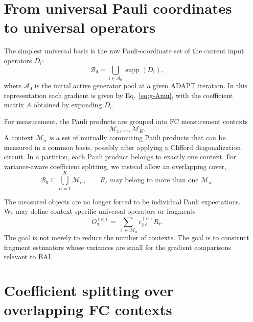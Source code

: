\documentclass[11pt]{article}
\newcommand{\supp}{\operatorname{supp}}
\begin{document}
\section{From universal Pauli coordinates to universal operators}

The simplest universal basis is the raw Pauli-coordinate set of the current input operators $D_i$:
\begin{equation}
    \mathcal B_0 = \bigcup_{i\in\mathcal A_0} \supp(D_i),
    \label{eq:parent-basis}
\end{equation}
where $\mathcal A_0$ is the initial active generator pool at a given ADAPT iteration. In this representation each gradient is given by Eq.~\eqref{eq:g-Amu}, with the coefficient matrix $A$ obtained by expanding $D_i$.

For measurement, the Pauli products are grouped into FC measurement contexts
\begin{equation}
    \mathcal M_1,\ldots,\mathcal M_K.
\end{equation}
A context $\mathcal M_\alpha$ is a set of mutually commuting Pauli products that can be measured in a common basis, possibly after applying a Clifford diagonalization circuit. In a partition, each Pauli product belongs to exactly one context. For variance-aware coefficient splitting, we instead allow an overlapping cover,
\begin{equation}
    \mathcal B_0 \subseteq \bigcup_{\alpha=1}^{K} \mathcal M_\alpha,
    \qquad
    R_\ell \text{ may belong to more than one } \mathcal M_\alpha.
\end{equation}

The measured objects are no longer forced to be individual Pauli expectations. We may define context-specific universal operators or fragments
\begin{equation}
    O_{q}^{(\alpha)} = \sum_{\ell\in\mathcal M_\alpha} c^{(\alpha)}_{q\ell} R_\ell.
\end{equation}
The goal is not merely to reduce the number of contexts. The goal is to construct fragment estimators whose variances are small for the gradient comparisons relevant to BAI.

\section{Coefficient splitting over overlapping FC contexts}
\end{document}
